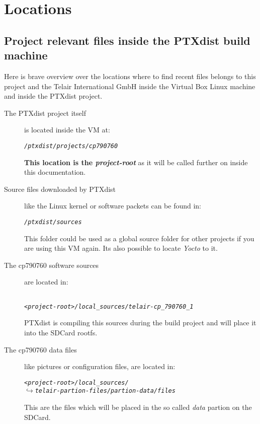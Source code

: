 \chapter{Locations}%
\label{cha:locations}

\section{Project relevant files inside the PTXdist build machine}%
\label{sec:relevant_files}


Here is brave overview over the locations where to find recent files belongs to
this project and the Telair International GmbH inside the Virtual Box Linux
machine and inside the PTXdist project.

\begin{description}

    \item[The PTXdist project itself] is located inside the \gls{VM} at:

        \begin{alltt}
        \textit{/ptxdist/projects/cp790760}
        \end{alltt}

        \textbf{This location is the \textit{project-root}} as it will be called
        further on inside this documentation.

    \item[Source files downloaded by PTXdist] like the Linux kernel or software
        packets can be found in:

        \begin{alltt}
        \textit{/ptxdist/sources}
        \end{alltt}

        This folder could be
        used as a global source folder for other projects if you are using this
        VM again. Its also possible to locate \textit{Yocto} to it.

    \item[The cp790760 software sources] are located in:

        \begin{alltt}~\label{part:location_cp790760_software}
        \textit{<project-root>/local\_sources/telair-cp\_790760\_1 }
        \end{alltt}

        PTXdist is compiling this sources during the build project and will
        place it into the SDCard rootfs.

    \item[The cp790760 data files] like pictures or configuration files, are
        located in:
        \begin{alltt}
        \textit{<project-root>/local\_sources/
        \qquad\(\hookrightarrow\) telair-partion-files/partion-data/files}
        \end{alltt}
        This are the files which will be placed in the so called \textit{data}
        partion on the SDCard.


\end{description}
